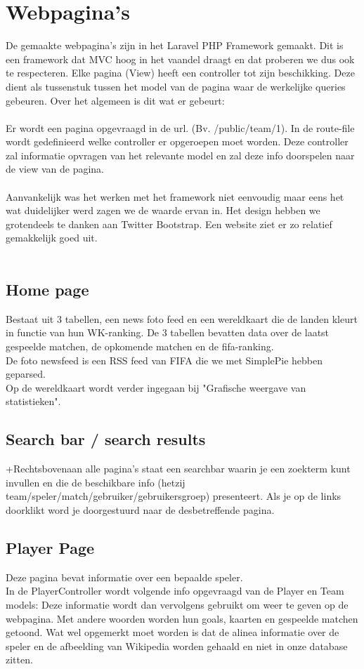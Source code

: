 \documentclass[11pt, a4paper]{article}
\begin{document}
\section{Webpagina's}
De gemaakte webpagina's zijn in het Laravel PHP Framework gemaakt. Dit is een framework dat MVC hoog in het vaandel draagt en dat proberen we dus ook te respecteren.
Elke pagina (View) heeft een controller tot zijn beschikking. Deze dient als tussenstuk tussen het model van de pagina waar de werkelijke queries gebeuren. Over het algemeen is dit wat er gebeurt:
\\
\\
Er wordt een pagina opgevraagd in de url. (Bv. /public/team/1). In de route-file wordt gedefinieerd welke controller er opgeroepen moet worden. Deze controller zal informatie opvragen van het
relevante model en zal deze info doorspelen naar de view van de pagina.
\\
\\
Aanvankelijk was het werken met het framework niet eenvoudig maar eens het wat duidelijker werd zagen we de waarde ervan in.
Het design hebben we grotendeels te danken aan Twitter Bootstrap. Een website ziet er zo relatief gemakkelijk goed uit.
\\
\\
\subsection{Home page}
Bestaat uit 3 tabellen, een news foto feed en een wereldkaart die de landen kleurt in functie van hun WK-ranking.
De 3 tabellen bevatten data over de laatst gespeelde matchen, de opkomende matchen en de fifa-ranking.
\\
De foto newsfeed is een RSS feed van FIFA die we met SimplePie hebben geparsed.
\\
Op de wereldkaart wordt verder ingegaan bij "Grafische weergave van statistieken".
\subsection{Search bar / search results}
+Rechtsbovenaan alle pagina's staat een searchbar waarin je een zoekterm kunt invullen en die de beschikbare info (hetzij team/speler/match/gebruiker/gebruikersgroep) presenteert. Als je op de links doorklikt word je doorgestuurd naar de desbetreffende pagina.
\subsection{Player Page}
Deze pagina bevat informatie over een bepaalde speler.
\\
In de PlayerController wordt volgende info opgevraagd van de Player en Team models:
Deze informatie wordt dan vervolgens gebruikt om weer te geven op de webpagina. Met andere woorden worden hun goals, kaarten en gespeelde matchen getoond. Wat wel opgemerkt moet worden is dat de alinea informatie over de speler en de afbeelding van Wikipedia worden gehaald en niet in onze database zitten.
\end{document}
